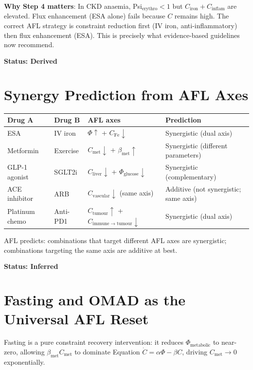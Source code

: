 \documentclass[12pt,a4paper]{article}
\begin{document}
\textbf{Why Step 4 matters}: In CKD anaemia, Psi$_{\mathrm{erythro}} < 1$ but $C_{\mathrm{iron}} + C_{\mathrm{inflam}}$ are elevated. Flux enhancement (ESA alone) fails because $C$ remains high. The correct AFL strategy is constraint reduction first (IV iron, anti-inflammatory) then flux enhancement (ESA). This is precisely what evidence-based guidelines now recommend.

\textbf{Status: Derived}

\section{Synergy Prediction from AFL Axes}

\begin{center}
\begin{tabular}{llll}
\toprule
Drug A & Drug B & AFL axes & Prediction \\
\midrule
ESA & IV iron & $\Phi \uparrow$ + $C_{\mathrm{Fe}} \downarrow$ & Synergistic (dual axis) \\
Metformin & Exercise & $C_{\mathrm{met}} \downarrow$ + $\beta_{\mathrm{met}} \uparrow$ & Synergistic (different parameters) \\
GLP-1 agonist & SGLT2i & $C_{\mathrm{liver}} \downarrow$ + $\Phi_{\mathrm{glucose}} \downarrow$ & Synergistic (complementary) \\
ACE inhibitor & ARB & $C_{\mathrm{vascular}} \downarrow$ (same axis) & Additive (not synergistic; same axis) \\
Platinum chemo & Anti-PD1 & $C_{\mathrm{tumour}} \uparrow$ + $C_{\mathrm{immune} \to \mathrm{tumour}} \downarrow$ & Synergistic (dual axis) \\
\bottomrule
\end{tabular}
\end{center}

AFL predicts: combinations that target different AFL axes are synergistic; combinations targeting the same axis are additive at best.

\textbf{Status: Inferred}

\section{Fasting and OMAD as the Universal AFL Reset}

Fasting is a pure constraint recovery intervention: it reduces $\Phi_{\mathrm{metabolic}}$ to near-zero, allowing $\beta_{\mathrm{met}} C_{\mathrm{met}}$ to dominate Equation $\dot{C} = \alpha\Phi - \beta C$, driving $C_{\mathrm{met}} \to 0$ exponentially.
\end{document}
